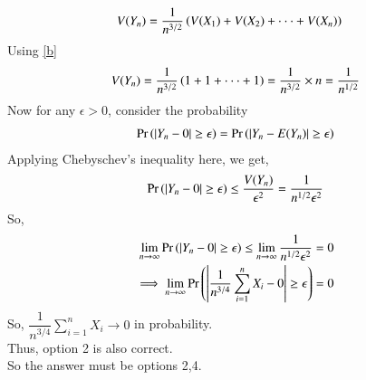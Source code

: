 \documentclass[journal,12pt,twocolumn]{IEEEtran}
\begin{document}
\begin{align}
    V(Y_n) &= \dfrac{1}{n^{3/2}}\left(V(X_1)+V(X_2)+ \cdot \cdot \cdot +V(X_n)\right)
\end{align}
Using \eqref{b}
\begin{align}
    V(Y_n)=\dfrac{1}{n^{3/2}}\left(1+1+\cdot \cdot \cdot+1\right)=\dfrac{1}{n^{3/2}}\times n=\dfrac{1}{n^{1/2}}
\end{align}
Now for any $\epsilon>0$, consider the probability
\begin{align}
    \Pr\left(|Y_n-0|\geq \epsilon\right)=\Pr\left(|Y_n-E(Y_n)|\geq \epsilon\right)
\end{align}
Applying Chebyschev's inequality here, we get,
\begin{align}
    \Pr\left(|Y_n-0|\geq \epsilon\right) \leq \dfrac{V(Y_n)}{\epsilon^2} = \dfrac{1}{n^{1/2}\epsilon^2}
\end{align}
So,
\begin{align}
    \lim_{n \to \infty}\Pr\left(|Y_n-0|\geq \epsilon\right) \leq \lim_{n \to \infty }\dfrac{1}{n^{1/2}\epsilon^2}=0\\
    \implies \lim_{n \to \infty}\Pr\left(\left | \dfrac{1}{n^{3/4}}\sum_{i=1}^nX_i - 0 \right|\geq \epsilon\right)=0
\end{align}
So, $\dfrac{1}{n^{3/4}}\sum_{i=1}^nX_i \to 0$ in probability.\\
Thus, option 2 is also correct.\\
So the answer must be options 2,4.
\end{document}
